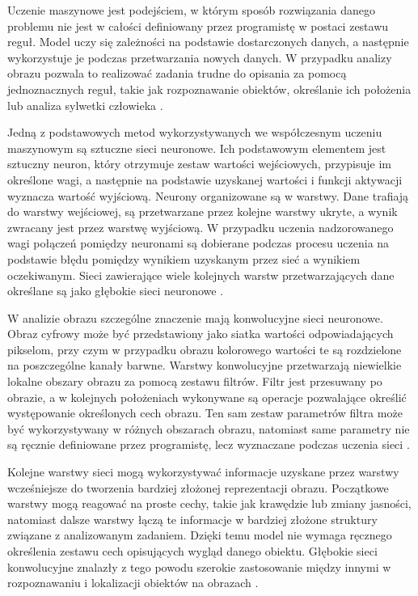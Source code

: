 Uczenie maszynowe jest podejściem, w którym sposób rozwiązania danego problemu nie jest w całości definiowany przez programistę w postaci zestawu reguł. Model uczy się zależności na podstawie dostarczonych danych, a następnie wykorzystuje je podczas przetwarzania nowych danych. W przypadku analizy obrazu pozwala to realizować zadania trudne do opisania za pomocą jednoznacznych reguł, takie jak rozpoznawanie obiektów, określanie ich położenia lub analiza sylwetki człowieka \cite{lecun2015deep,chen2020monocular}.

Jedną z podstawowych metod wykorzystywanych we współczesnym uczeniu maszynowym są sztuczne sieci neuronowe. Ich podstawowym elementem jest sztuczny neuron, który otrzymuje zestaw wartości wejściowych, przypisuje im określone wagi, a następnie na podstawie uzyskanej wartości i funkcji aktywacji wyznacza wartość wyjściową. Neurony organizowane są w warstwy. Dane trafiają do warstwy wejściowej, są przetwarzane przez kolejne warstwy ukryte, a wynik zwracany jest przez warstwę wyjściową. W przypadku uczenia nadzorowanego wagi połączeń pomiędzy neuronami są dobierane podczas procesu uczenia na podstawie błędu pomiędzy wynikiem uzyskanym przez sieć a wynikiem oczekiwanym. Sieci zawierające wiele kolejnych warstw przetwarzających dane określane są jako głębokie sieci neuronowe \cite{lecun2015deep}.

W analizie obrazu szczególne znaczenie mają konwolucyjne sieci neuronowe. Obraz cyfrowy może być przedstawiony jako siatka wartości odpowiadających pikselom, przy czym w przypadku obrazu kolorowego wartości te są rozdzielone na poszczególne kanały barwne. Warstwy konwolucyjne przetwarzają niewielkie lokalne obszary obrazu za pomocą zestawu filtrów. Filtr jest przesuwany po obrazie, a w kolejnych położeniach wykonywane są operacje pozwalające określić występowanie określonych cech obrazu. Ten sam zestaw parametrów filtra może być wykorzystywany w różnych obszarach obrazu, natomiast same parametry nie są ręcznie definiowane przez programistę, lecz wyznaczane podczas uczenia sieci \cite{lecun2015deep}.

Kolejne warstwy sieci mogą wykorzystywać informacje uzyskane przez warstwy wcześniejsze do tworzenia bardziej złożonej reprezentacji obrazu. Początkowe warstwy mogą reagować na proste cechy, takie jak krawędzie lub zmiany jasności, natomiast dalsze warstwy łączą te informacje w bardziej złożone struktury związane z analizowanym zadaniem. Dzięki temu model nie wymaga ręcznego określenia zestawu cech opisujących wygląd danego obiektu. Głębokie sieci konwolucyjne znalazły z tego powodu szerokie zastosowanie między innymi w rozpoznawaniu i lokalizacji obiektów na obrazach \cite{lecun2015deep}.

